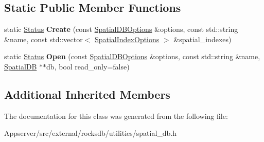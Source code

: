 \subsection*{Static Public Member Functions}
\begin{DoxyCompactItemize}
\item 
static \hyperlink{classrocksdb_1_1Status}{Status} {\bfseries Create} (const \hyperlink{structrocksdb_1_1spatial_1_1SpatialDBOptions}{Spatial\+D\+B\+Options} \&options, const std\+::string \&name, const std\+::vector$<$ \hyperlink{structrocksdb_1_1spatial_1_1SpatialIndexOptions}{Spatial\+Index\+Options} $>$ \&spatial\+\_\+indexes)\hypertarget{classrocksdb_1_1spatial_1_1SpatialDB_a7341ddde1e5448b8f92373a716438382}{}\label{classrocksdb_1_1spatial_1_1SpatialDB_a7341ddde1e5448b8f92373a716438382}

\item 
static \hyperlink{classrocksdb_1_1Status}{Status} {\bfseries Open} (const \hyperlink{structrocksdb_1_1spatial_1_1SpatialDBOptions}{Spatial\+D\+B\+Options} \&options, const std\+::string \&name, \hyperlink{classrocksdb_1_1spatial_1_1SpatialDB}{Spatial\+DB} $\ast$$\ast$db, bool read\+\_\+only=false)\hypertarget{classrocksdb_1_1spatial_1_1SpatialDB_ae13db275176c600dd7d99b843ec047f9}{}\label{classrocksdb_1_1spatial_1_1SpatialDB_ae13db275176c600dd7d99b843ec047f9}

\end{DoxyCompactItemize}
\subsection*{Additional Inherited Members}


The documentation for this class was generated from the following file\+:\begin{DoxyCompactItemize}
\item 
Appserver/src/external/rocksdb/utilities/spatial\+\_\+db.\+h\end{DoxyCompactItemize}

